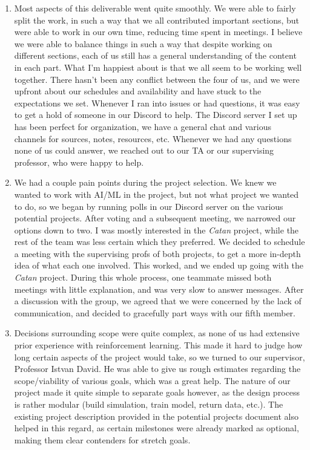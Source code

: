 \documentclass{article}
\begin{document}
\begin{enumerate}
    \item
        Most aspects of this deliverable went quite smoothly.
        We were able to fairly split the work, in such a way that we all contributed important sections, but were able to work in our own time, reducing time spent in meetings.
        I believe we were able to balance things in such a way that despite working on different sections, each of us still has a general understanding of the content in each part.
        What I'm happiest about is that we all seem to be working well together.
        There hasn't been any conflict between the four of us, and we were upfront about our schedules and availability and have stuck to the expectations we set.
        Whenever I ran into issues or had questions, it was easy to get a hold of someone in our Discord to help.
        The Discord server I set up has been perfect for organization, we have a general chat and various channels for sources, notes, resources, etc.
        Whenever we had any questions none of us could answer, we reached out to our TA or our supervising professor, who were happy to help.

    \item
        We had a couple pain points during the project selection.
        We knew we wanted to work with AI/ML in the project, but not what project we wanted to do, so we began by running polls in our Discord server on the various potential projects.
        After voting and a subsequent meeting, we narrowed our options down to two.
        I was mostly interested in the \emph{Catan} project, while the rest of the team was less certain which they preferred.
        We decided to schedule a meeting with the supervising profs of both projects, to get a more in-depth idea of what each one involved.
        This worked, and we ended up going with the \emph{Catan} project.
        During this whole process, one teammate missed both meetings with little explanation, and was very slow to answer messages.
        After a discussion with the group, we agreed that we were concerned by the lack of communication, and decided to gracefully part ways with our fifth member.

    \item
        Decisions surrounding scope were quite complex, as none of us had extensive prior experience with reinforcement learning.
        This made it hard to judge how long certain aspects of the project would take, so we turned to our supervisor, Professor Istvan David.
        He was able to give us rough estimates regarding the scope/viability of various goals, which was a great help.
        The nature of our project made it quite simple to separate goals however, as the design process is rather modular (build simulation, train model, return data, etc.).
        The existing project description provided in the potential projects document also helped in this regard, as certain milestones were already marked as optional, making them clear contenders for stretch goals.

\end{enumerate}
\end{document}
